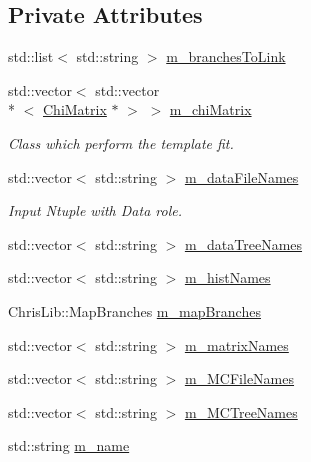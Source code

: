 \subsection*{Private Attributes}
\begin{DoxyCompactItemize}
\item 
std\+::list$<$ std\+::string $>$ \hyperlink{classTemplateMethod_1_1Template_a5cb7f09dfc69f6d0f88b444ea2ca5626}{m\+\_\+branches\+To\+Link}
\item 
std\+::vector$<$ std\+::vector\\*
$<$ \hyperlink{classTemplateMethod_1_1ChiMatrix}{Chi\+Matrix} $\ast$ $>$ $>$ \hyperlink{classTemplateMethod_1_1Template_a10d645836ba9c45f6a4bc1106fa2d1cb}{m\+\_\+chi\+Matrix}
\begin{DoxyCompactList}\small\item\em Class which perform the template fit. \end{DoxyCompactList}\item 
std\+::vector$<$ std\+::string $>$ \hyperlink{classTemplateMethod_1_1Template_a73909bd12564ad0fcd2041cbe9dab87b}{m\+\_\+data\+File\+Names}
\begin{DoxyCompactList}\small\item\em Input Ntuple with Data role. \end{DoxyCompactList}\item 
std\+::vector$<$ std\+::string $>$ \hyperlink{classTemplateMethod_1_1Template_ae4dfe9c9cc46d278b3c935712dc79248}{m\+\_\+data\+Tree\+Names}
\item 
std\+::vector$<$ std\+::string $>$ \hyperlink{classTemplateMethod_1_1Template_a7cfcec2fe2f001b25f8c8574a3b5ed4a}{m\+\_\+hist\+Names}
\item 
Chris\+Lib\+::\+Map\+Branches \hyperlink{classTemplateMethod_1_1Template_ab05d19cbe5bdce62ea148d672a40d7ef}{m\+\_\+map\+Branches}
\item 
std\+::vector$<$ std\+::string $>$ \hyperlink{classTemplateMethod_1_1Template_ac471001abf5eba50a5856378574306bb}{m\+\_\+matrix\+Names}
\item 
std\+::vector$<$ std\+::string $>$ \hyperlink{classTemplateMethod_1_1Template_ab4511b6f80b2dc06c38507c23300a40d}{m\+\_\+\+M\+C\+File\+Names}
\item 
std\+::vector$<$ std\+::string $>$ \hyperlink{classTemplateMethod_1_1Template_a956f8df3f8f5756bbac13d5fa83c2229}{m\+\_\+\+M\+C\+Tree\+Names}
\item 
std\+::string \hyperlink{classTemplateMethod_1_1Template_adb41893ba19e889e56c559f25fc1a68a}{m\+\_\+name}

\end{DoxyCompactItemize}
